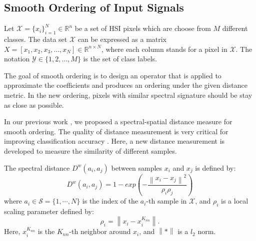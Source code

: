 \documentclass{ws-ijwmip}
\begin{document}
\subsection{Smooth Ordering of Input Signals}
%


Let $\mathcal{X}=\{x_i\}_{i=1}^N\in \mathbb{R}^n$ be a set of HSI pixels which are choose from $M$ different classes. The data set $\mathcal{X}$ can be expressed as a matrix $X = [x_1,x_2,x_3,\dots,x_N] \in \mathbb{R}^{n\times N}$, where each column stands for a pixel in $\mathcal{X}$. The notation $\mathcal{Y} \in \{1,2,\dots,M\}$ is the set of class labels. 



The goal of smooth ordering is to design an operator that is applied to approximate the coefficients and produces an ordering under the given distance metric. 
In the new ordering, pixels with similar spectral signature should be stay as close as possible.

In our previous work \cite{31}, we proposed a spectral-spatial distance measure for smooth ordering. The quality of distance measurement is very critical for improving classification accuracy \cite{ML1DE}. Here, a new distance measurement is developed to measure the similarity of different samples. 

The spectral distance $D^w(a_i, a_j)$ between samples $x_i$ and $x_j$ is defined by:
 \begin{equation}
    D^w(a_i, a_j) = 1 - exp(-\frac{\left \| x_i - x_j \right \|^2}{\rho _i\rho _j})
    \label{equ2.6}
\end{equation}
 where $a_i\in \mathcal{S}=\{1,\cdots, N\}$ is the index of the $a_i$-th sample in $\mathcal{X}$, and 
 $\rho_i$ is a local scaling parameter defined by:
 \begin{equation}
   \rho _i = \left \| x_i-x_i^{K_{nn}} \right \|.
   \label{equ2.7}
\end{equation}
Here,  $x_i^{K_{nn}}$ is the $K_{nn}$-th neighbor around $x_i$, and $\left \| * \right \|$ is a $l_2$ norm.
\end{document}
